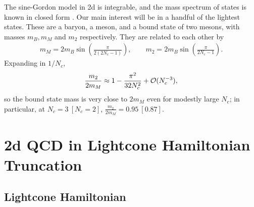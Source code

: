 \documentclass[12pt]{article}
\newcommand{\be}{\begin{eqnarray}}
\newcommand{\ee}{\end{eqnarray}}
\newcommand{\CO}{{\cal O}}
\begin{document}
 The sine-Gordon model in 2d is integrable, and the mass spectrum of states is known in closed form \cite{Dashen:1975hd}.  Our main interest will be in a handful of the lightest states.  These are a baryon, a meson, and a bound state of two mesons, with masses $m_B, m_M$ and $m_2$ respectively.  They are related to each other by
\be
m_M = 2 m_B \sin \left( \frac{\pi}{2(2N_c-1)}\right), \qquad m_2 = 2 m_B \sin \left(  \frac{\pi}{2N_c-1}\right) . 
\label{eq:SineGordonMassPrediction}
\ee 
Expanding in $1/N_c$, 
\be
\frac{m_2}{2m_M} \approx 1  - \frac{ \pi^2 }{32 N_c^2}  + \CO(N_c^{-3}),
\ee
so the bound state mass is very close to $2m_M$ even for modestly large $N_c$; in particular, at $N_c=3 \ [N_c=2]$, $\frac{m_2}{2 m_M} = 0.95 \ [0.87]$.


 
 \section{2d QCD in Lightcone Hamiltonian Truncation}
\label{masslessLCT}

\subsection{Lightcone Hamiltonian}
\end{document}
